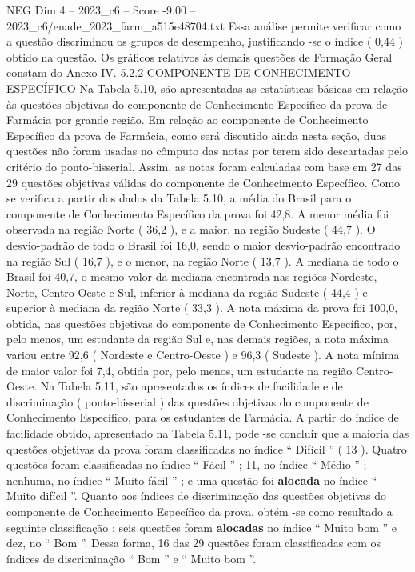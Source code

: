 \begin{textsample}{NEG Dim 4 – 2023\_c6 – Score -9.00 – 2023\_c6/enade\_2023\_farm\_a515e48704.txt}
Essa análise permite verificar como a questão discriminou os grupos de desempenho, justificando -se o índice ( 0,44 ) obtido na questão.
Os gráficos relativos às demais questões de Formação Geral constam do Anexo IV. 5.2.2 COMPONENTE DE CONHECIMENTO ESPECÍFICO Na Tabela 5.10, são apresentadas as estatísticas básicas em relação às questões objetivas do componente de Conhecimento Específico da prova de Farmácia por grande região.
Em relação ao componente de Conhecimento Específico da prova de Farmácia, como será discutido ainda nesta seção, duas questões não foram usadas no cômputo das notas por terem sido descartadas pelo critério do ponto-bisserial.
Assim, as notas foram calculadas com base em 27 das 29 questões objetivas válidas do componente de Conhecimento Específico.
Como se verifica a partir dos dados da Tabela 5.10, a média do Brasil para o componente de Conhecimento Específico da prova foi 42,8.
A menor média foi observada na região Norte ( 36,2 ), e a maior, na região Sudeste ( 44,7 ).
O desvio-padrão de todo o Brasil foi 16,0, sendo o maior desvio-padrão encontrado na região Sul ( 16,7 ), e o menor, na região Norte ( 13,7 ).
A mediana de todo o Brasil foi 40,7, o mesmo valor da mediana encontrada nas regiões Nordeste, Norte, Centro-Oeste e Sul, inferior à mediana da região Sudeste ( 44,4 ) e superior à mediana da região Norte ( 33,3 ).
A nota máxima da prova foi 100,0, obtida, nas questões objetivas do componente de Conhecimento Específico, por, pelo menos, um estudante da região Sul e, nas demais regiões, a nota máxima variou entre 92,6 ( Nordeste e Centro-Oeste ) e 96,3 ( Sudeste ).
A nota mínima de maior valor foi 7,4, obtida por, pelo menos, um estudante na região Centro-Oeste.
Na Tabela 5.11, são apresentados os índices de facilidade e de discriminação ( ponto-bisserial ) das questões objetivas do componente de Conhecimento Específico, para os estudantes de Farmácia.
A partir do índice de facilidade obtido, apresentado na Tabela 5.11, pode -se concluir que a maioria das questões objetivas da prova foram classificadas no índice “ Difícil ” ( 13 ).
Quatro questões foram classificadas no índice “ Fácil ” ; 11, no índice “ Médio ” ; nenhuma, no índice “ Muito fácil ” ; e uma questão foi \textbf{alocada} no índice “ Muito difícil ”.
Quanto aos índices de discriminação das questões objetivas do componente de Conhecimento Específico da prova, obtém -se como resultado a seguinte classificação : seis questões foram \textbf{alocadas} no índice “ Muito bom ” e dez, no “ Bom ”.
Dessa forma, 16 das 29 questões foram classificadas com os índices de discriminação “ Bom ” e “ Muito bom ”.

\end{textsample}
